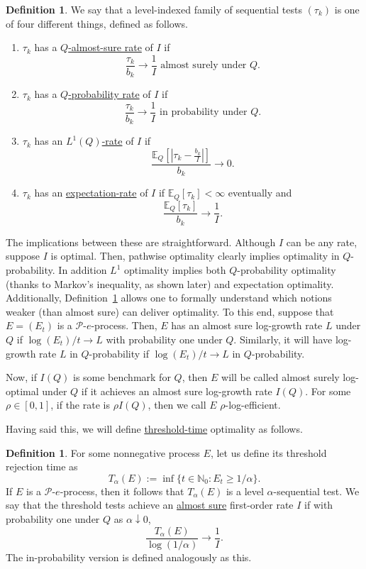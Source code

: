 \documentclass{article}
\newcommand{\PP}{\mathcal P}
\newcommand{\EE}{\mathbb E}
\theoremstyle{definition}
\newtheorem{definition}[theorem]{Definition}
\begin{document}
\begin{definition}\label{def:test-optimality}
We say that a level-indexed family of sequential tests $(\tau_k)$ is one of four different things, defined as follows.
\begin{enumerate}
    \item $\tau_k$ has a \underline{$Q$-almost-sure rate} of $I$ if
    \[
    \frac{\tau_k}{b_k}\to \frac{1}{I} \text{ almost surely under $Q$.}
    \]
    \item $\tau_k$ has a  \underline{$Q$-probability rate} of $I$ if
    \[
    \frac{\tau_k}{b_k}\to \frac{1}{I}\text{ in probability under $Q$.}
    \]
    \item $\tau_k$ has an \underline{$L^{1}(Q)$-rate} of $I$ if
    \[
    \frac{\EE_Q\left[\left|\tau_k-\frac{b_k}{I}\right|\right]}{b_k}\to 0.
    \]
    \item $\tau_k$ has an \underline{expectation-rate} of $I$ if $\EE_Q[\tau_k]<\infty$ eventually and
    \[
    \frac{\EE_Q[\tau_k]}{b_k}\to\frac{1}{I}.
    \]
\end{enumerate}
\end{definition}
The implications between these are straightforward. Although $I$ can be any rate, suppose $I$ is optimal. Then, pathwise optimality clearly implies optimality in $Q$-probability. In addition $L^{1}$ optimality implies both $Q$-probability optimality (thanks to Markov's inequality, as shown later) and expectation optimality. Additionally, Definition~\ref{def:test-optimality} allows one to formally understand which notions weaker (than almost sure) can deliver optimality. To this end, suppose that $E=(E_t)$ is a $\PP$-$e$-process. Then, $E$ has an almost sure log-growth rate $L$ under $Q$ if $\log(E_t)/t\to L$ with probability one under $Q$. Similarly, it will have log-growth rate $L$ in $Q$-probability if $\log(E_t)/t\to L$ in $Q$-probability. 

Now, if $I(Q)$ is some benchmark for $Q$, then $E$ will be called almost surely log-optimal under $Q$ if it achieves an almost sure log-growth rate $I(Q)$. For some $\rho\in[0,1]$, if the rate is $\rho I(Q)$, then we call $E$ $\rho$-log-efficient. 

Having said this, we will define \underline{threshold-time} optimality as follows. 

\begin{definition}\label{def:threshold-time-optimality}
For some nonnegative process $E$, let us define its threshold rejection time as
\[
T_{\alpha}(E):=\inf\{t\in\mathbb N_0: E_t\ge 1/\alpha\}.
\]
If $E$ is a $\PP$-$e$-process, then it follows that $T_{\alpha}(E)$ is a level $\alpha$-sequential test. We say that the threshold tests achieve an \underline{almost sure} first-order rate $I$ if with probability one under $Q$ as $\alpha\downarrow 0$,
\[
\frac{T_{\alpha}(E)}{\log(1/\alpha)}\to \frac1I.
\]
The in-probability version is defined analogously as this.
\end{definition}
\end{document}
